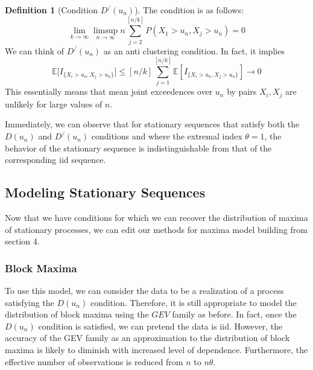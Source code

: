 \documentclass{article}
\theoremstyle{definition}
\theoremstyle{definition}
\newtheorem{definition}{Definition}
\def\E{\mathbb{E}}
\begin{document}
\begin{definition}[Condition $D^/(u_n)$]
The condition is as follows:
\[\lim_{k\rightarrow\infty} \limsup_{n\rightarrow \infty} n\sum_{j=2}^{[{n/k}]}P(X_1>u_n, X_j>u_n)=0\]
We can think of $D^/(u_n)$ as an anti clustering condition. In fact, it implies 
\[\E\bigg[ I_{\{X_i>u_n, X_j>u_n\}} \bigg] \leq [n/k] \sum_{j=1}^{[n/k]}\E [I_{\{X_i>u_n, X_j>u_n\}}] \rightarrow 0\]
This essentially means that mean joint exceedences over $u_n$ by pairs $X_i,X_j$ are unlikely for large values of $n$.
\end{definition}
Immediately, we can observe that for stationary sequences that satisfy both the $D(u_n)$ and $D^/(u_n)$ conditions and where the extremal index $\theta=1$, the behavior of the stationary sequence is indistinguishable from that of the corresponding iid sequence.
\subsection{Modeling Stationary Sequences}
Now that we have conditions for which we can recover the distribution of maxima of stationary processes, we can edit our methods for maxima model building from section 4. 
\subsubsection{Block Maxima}
To use this model, we can consider the data to be a realization of a process satisfying the $D(u_n)$ condition. Therefore, it is still appropriate to model the distribution of block maxima using the $GEV$ family as before. In fact, once the $D(u_n)$ condition is satisfied, we can pretend the data is iid. However, the accuracy of the GEV family as an approximation to the distribution of block maxima is
likely to diminish with increased level of dependence. Furthermore, the effective number of observations is reduced from $n$ to $n\theta$.
\end{document}
